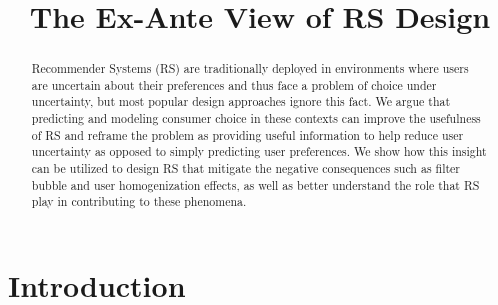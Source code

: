 \documentclass[sigconf]{acmart}
\begin{document}
%
\title{The Ex-Ante View of RS Design}
%

%
\begin{abstract}
Recommender Systems (RS) are traditionally deployed in environments where users are uncertain about their preferences and thus face a problem of choice under uncertainty, but most popular design approaches ignore this fact. We argue that predicting and modeling consumer choice in these contexts can improve the usefulness of RS and reframe the problem as providing useful information to help reduce user uncertainty as opposed to simply predicting user preferences. We show how this insight can be utilized to design RS that mitigate the negative consequences such as filter bubble and user homogenization effects, as well as better understand the role that RS play in contributing to these phenomena.
\end{abstract}

%
%

%

%
\maketitle

\section{Introduction}
\end{document}

